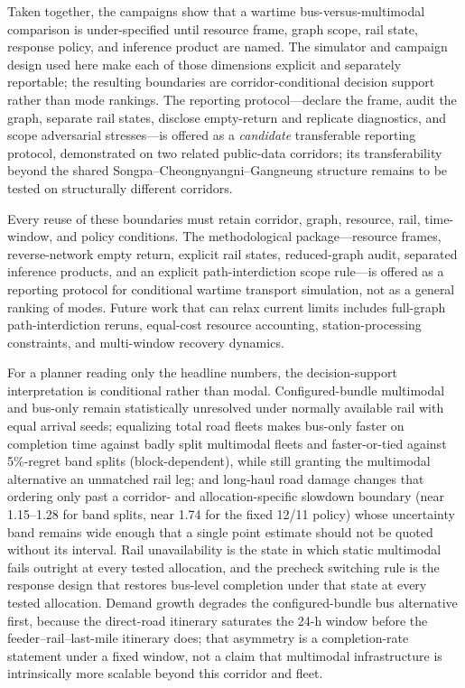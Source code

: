 \documentclass{ieeeaccess}
\begin{document}
Taken together, the campaigns show that a wartime bus-versus-multimodal comparison is under-specified until resource frame, graph scope, rail state, response policy, and inference product are named. The simulator and campaign design used here make each of those dimensions explicit and separately reportable; the resulting boundaries are corridor-conditional decision support rather than mode rankings. The reporting protocol---declare the frame, audit the graph, separate rail states, disclose empty-return and replicate diagnostics, and scope adversarial stresses---is offered as a \emph{candidate} transferable reporting protocol, demonstrated on two related public-data corridors; its transferability beyond the shared Songpa--Cheongnyangni--Gangneung structure remains to be tested on structurally different corridors.

Every reuse of these boundaries must retain corridor, graph, resource, rail, time-window, and policy conditions. The methodological package---resource frames, reverse-network empty return, explicit rail states, reduced-graph audit, separated inference products, and an explicit path-interdiction scope rule---is offered as a reporting protocol for conditional wartime transport simulation, not as a general ranking of modes. Future work that can relax current limits includes full-graph path-interdiction reruns, equal-cost resource accounting, station-processing constraints, and multi-window recovery dynamics.

For a planner reading only the headline numbers, the decision-support interpretation is conditional rather than modal. Configured-bundle multimodal and bus-only remain statistically unresolved under normally available rail with equal arrival seeds; equalizing total road fleets makes bus-only faster on completion time against badly split multimodal fleets and faster-or-tied against 5\%-regret band splits (block-dependent), while still granting the multimodal alternative an unmatched rail leg; and long-haul road damage changes that ordering only past a corridor- and allocation-specific slowdown boundary (near 1.15--1.28 for band splits, near 1.74 for the fixed 12/11 policy) whose uncertainty band remains wide enough that a single point estimate should not be quoted without its interval. Rail unavailability is the state in which static multimodal fails outright at every tested allocation, and the precheck switching rule is the response design that restores bus-level completion under that state at every tested allocation. Demand growth degrades the configured-bundle bus alternative first, because the direct-road itinerary saturates the 24-h window before the feeder--rail--last-mile itinerary does; that asymmetry is a completion-rate statement under a fixed window, not a claim that multimodal infrastructure is intrinsically more scalable beyond this corridor and fleet.
\end{document}
